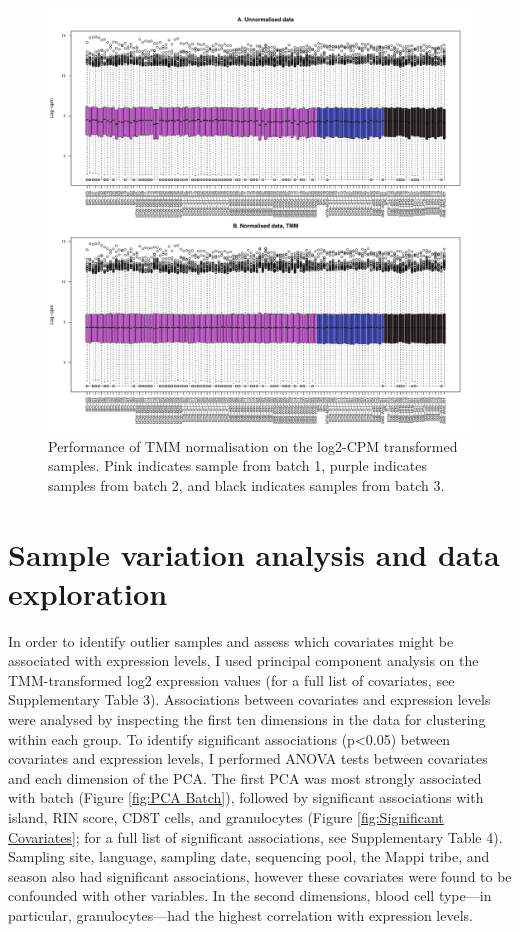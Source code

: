 \documentclass[12pt,a4paper,titlepage,twoside,openright]{book}
\begin{document}
\begin{mainmatter}
\begin{figure}[htb!]
\centering
\includegraphics[width=\textwidth,height=\textheight,keepaspectratio]{NormalisedGeneExpressionDistribution_IndoRNA_TMM.pdf}
\caption{Performance of TMM normalisation on the log2-CPM transformed samples. Pink indicates sample from batch 1, purple indicates samples from batch 2, and black indicates samples from batch 3.}
\label{fig:TMM normalisation}
\end{figure}

\section{Sample variation analysis and data exploration}
In order to identify outlier samples and assess which covariates might be associated with expression levels, I used principal component analysis on the TMM-transformed log2 expression values (for a full list of covariates, see Supplementary Table 3). Associations between covariates and expression levels were analysed by inspecting the first ten dimensions in the data for clustering within each group. To identify significant associations (p<0.05) between covariates and expression levels, I performed ANOVA tests between covariates and each dimension of the PCA. The first PCA was most strongly associated with batch (﻿Figure \ref{fig:PCA Batch}), followed by significant associations with island, RIN score, CD8T cells, and granulocytes (﻿Figure \ref{fig:Significant Covariates}; for a full list of significant associations, see Supplementary Table 4). Sampling site, language, sampling date, sequencing pool, the Mappi tribe, and season also had significant associations, however these covariates were found to be confounded with other variables. In the second dimensions, blood cell type—in particular, granulocytes—had the highest correlation with expression levels. 


\end{mainmatter}
\end{document}
